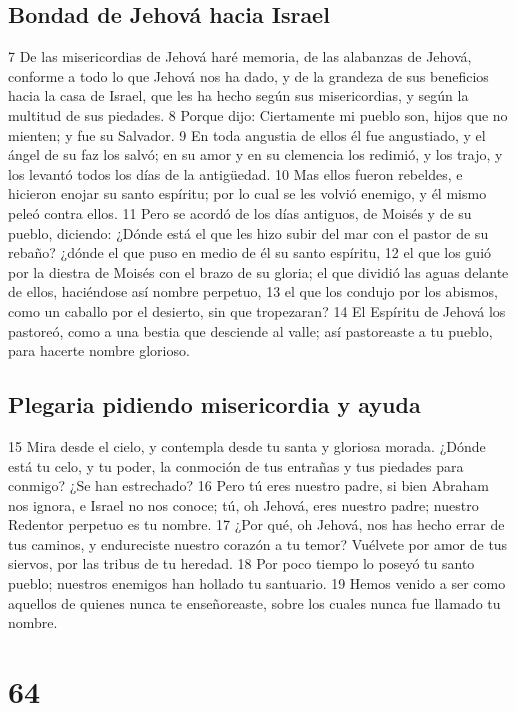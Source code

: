 \section*{Bondad de Jehová hacia Israel}

7 De las misericordias de Jehová haré memoria, de las alabanzas de Jehová, conforme a todo lo que Jehová nos ha dado, y de la grandeza de sus beneficios hacia la casa de Israel, que les ha hecho según sus misericordias, y según la multitud de sus piedades.
8 Porque dijo: Ciertamente mi pueblo son, hijos que no mienten; y fue su Salvador.
9 En toda angustia de ellos él fue angustiado, y el ángel de su faz los salvó; en su amor y en su clemencia los redimió, y los trajo, y los levantó todos los días de la antigüedad.
10 Mas ellos fueron rebeldes, e hicieron enojar su santo espíritu; por lo cual se les volvió enemigo, y él mismo peleó contra ellos.
11 Pero se acordó de los días antiguos, de Moisés y de su pueblo, diciendo: ¿Dónde está el que les hizo subir del mar con el pastor de su rebaño? ¿dónde el que puso en medio de él su santo espíritu,
12 el que los guió por la diestra de Moisés con el brazo de su gloria; el que dividió las aguas delante de ellos, haciéndose así nombre perpetuo,
13 el que los condujo por los abismos, como un caballo por el desierto, sin que tropezaran?
14 El Espíritu de Jehová los pastoreó, como a una bestia que desciende al valle; así pastoreaste a tu pueblo, para hacerte nombre glorioso.

\section*{Plegaria pidiendo misericordia y ayuda}

15 Mira desde el cielo, y contempla desde tu santa y gloriosa morada. ¿Dónde está tu celo, y tu poder, la conmoción de tus entrañas y tus piedades para conmigo? ¿Se han estrechado?
16 Pero tú eres nuestro padre, si bien Abraham nos ignora, e Israel no nos conoce; tú, oh Jehová, eres nuestro padre; nuestro Redentor perpetuo es tu nombre.
17 ¿Por qué, oh Jehová, nos has hecho errar de tus caminos, y endureciste nuestro corazón a tu temor? Vuélvete por amor de tus siervos, por las tribus de tu heredad.
18 Por poco tiempo lo poseyó tu santo pueblo; nuestros enemigos han hollado tu santuario.
19 Hemos venido a ser como aquellos de quienes nunca te enseñoreaste, sobre los cuales nunca fue llamado tu nombre.

\chapter{64}


